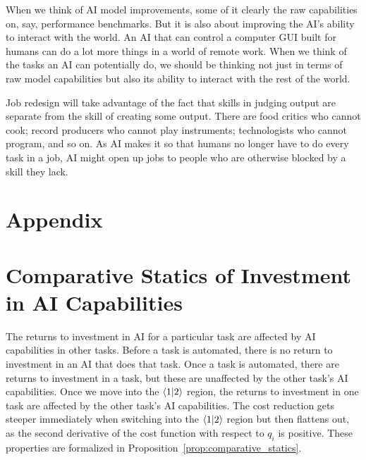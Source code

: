 \documentclass{article}
\theoremstyle{plain}
\theoremstyle{plain}
\begin{document}
When we think of AI model improvements, some of it clearly the raw capabilities on, say, performance benchmarks. 
But it is also about improving the AI's ability to interact with the world. 
An AI that can control a computer GUI built for humans can do a lot more things in a world of remote work.
When we think of the tasks an AI can potentially do, we should be thinking not just in terms of raw model capabilities but also its ability to interact with the rest of the world.

Job redesign will take advantage of the fact that skills in judging output are separate from the skill of creating some output.
There are food critics who cannot cook; record producers who cannot play instruments; technologists who cannot program, and so on.
As AI makes it so that humans no longer have to do every task in a job, AI might open up jobs to people who are otherwise blocked by a skill they lack.




\newpage
\appendix
\section*{Appendix}


\section{Comparative Statics of Investment in AI Capabilities}
\label{app:AI_capability_inv_comp_stat}
The returns to investment in AI for a particular task are affected by AI capabilities in other tasks.
Before a task is automated, there is no return to investment in an AI that does that task.
Once a task is automated, there are returns to investment in a task, but these are unaffected by the other task's AI capabilities.
Once we move into the \(\langle 1|2 \rangle\) region, the returns to investment in one task are affected by the other task's AI capabilities.
The cost reduction gets steeper immediately when switching into the \(\langle 1|2 \rangle\) region but then flattens out, as the second derivative of the cost function with respect to \(q_i\) is positive.
These properties are formalized in Proposition~\ref{prop:comparative_statics}.
\end{document}

